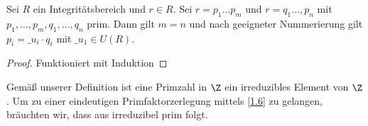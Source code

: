 \begin{st}
	Sei $R$ ein Integritätsbereich und $r \in R$.
	Sei $r = p_1 \dotsc p_m$ und $r = q_1 \dotsc, p_n$ mit $p_1, \dotsc, p_m, q_1, \dotsc, q_n$ prim.
	Dann gilt $m = n$ und nach geeigneter Nummerierung gilt $p_i = \_ u_i \cdot q_i$ mit $\_ u_1 \in U(R)$.
	\begin{proof}
		Funktioniert mit Induktion
	\end{proof}
\end{st}

Gemäß unserer Definition ist eine Primzahl in $\Z$ ein irreduzibles Element von $\Z$.
Um zu einer eindeutigen Primfaktorzerlegung mittels \ref{1.6} zu gelangen, bräuchten wir, dass aus irreduzibel prim folgt.
